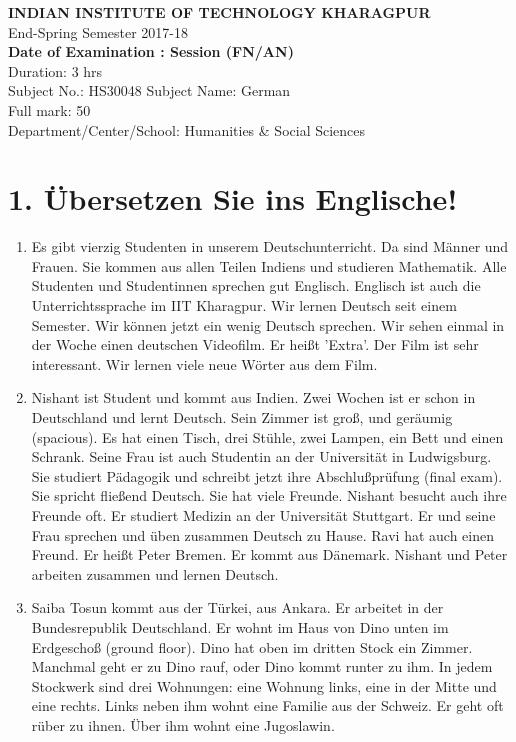\documentclass[a4paper,12pt]{article}
\begin{document}
\begin{center}
    {\LARGE \textbf{INDIAN INSTITUTE OF TECHNOLOGY KHARAGPUR}}\\[0.3cm]
    {\Large End-Spring Semester 2017-18}\\[0.5cm]
    \textbf{Date of Examination : \underline{\hspace{4cm}} \quad Session (FN/AN) \underline{\hspace{2cm}}}\\[0.3cm]
    Duration: 3 hrs \\
    Subject No.: HS30048 \quad Subject Name: German \\
    Full mark: 50 \\
    Department/Center/School: Humanities \& Social Sciences
\end{center}

\vspace{1cm}

\section*{1. Übersetzen Sie ins Englische!}

\begin{enumerate}[label=(\Alph*)]
    \item Es gibt vierzig Studenten in unserem Deutschunterricht. Da sind Männer und Frauen. Sie kommen aus allen Teilen Indiens und studieren Mathematik. Alle Studenten und Studentinnen sprechen gut Englisch. Englisch ist auch die Unterrichtssprache im IIT Kharagpur. Wir lernen Deutsch seit einem Semester. Wir können jetzt ein wenig Deutsch sprechen. Wir sehen einmal in der Woche einen deutschen Videofilm. Er heißt 'Extra'. Der Film ist sehr interessant. Wir lernen viele neue Wörter aus dem Film.
    \item Nishant ist Student und kommt aus Indien. Zwei Wochen ist er schon in Deutschland und lernt Deutsch. Sein Zimmer ist groß, und geräumig (spacious). Es hat einen Tisch, drei Stühle, zwei Lampen, ein Bett und einen Schrank. Seine Frau ist auch Studentin an der Universität in Ludwigsburg. Sie studiert Pädagogik und schreibt jetzt ihre Abschlußprüfung (final exam). Sie spricht fließend Deutsch. Sie hat viele Freunde. Nishant besucht auch ihre Freunde oft. Er studiert Medizin an der Universität Stuttgart. Er und seine Frau sprechen und üben zusammen Deutsch zu Hause. Ravi hat auch einen Freund. Er heißt Peter Bremen. Er kommt aus Dänemark. Nishant und Peter arbeiten zusammen und lernen Deutsch.
    \item Saiba Tosun kommt aus der Türkei, aus Ankara. Er arbeitet in der Bundesrepublik Deutschland. Er wohnt im Haus von Dino unten im Erdgeschoß (ground floor). Dino hat oben im dritten Stock ein Zimmer. Manchmal geht er zu Dino rauf, oder Dino kommt runter zu ihm. In jedem Stockwerk sind drei Wohnungen: eine Wohnung links, eine in der Mitte und eine rechts. Links neben ihm wohnt eine Familie aus der Schweiz. Er geht oft rüber zu ihnen. Über ihm wohnt eine Jugoslawin.
\end{enumerate}
\end{document}
